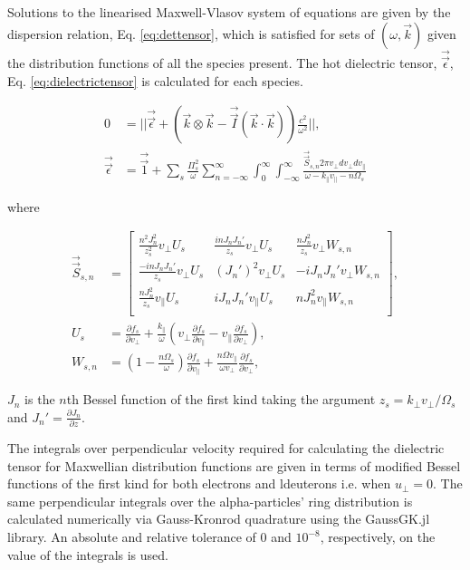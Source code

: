 \documentclass[12pt]{iopart}
\begin{document}
Solutions to the linearised Maxwell-Vlasov system of equations are given by the
dispersion relation, Eq. \ref{eq:dettensor}, which is satisfied for sets of
$(\omega,\vec{k})$ given the distribution functions of all the species present.
The hot dielectric tensor\cite{Stix}, $\vec{\vec{\epsilon}}$, Eq. \ref{eq:dielectrictensor} is calculated for each species.

\begin{align}
    0 &= ||\vec{\vec{\epsilon}} + \left(\vec{k} \otimes \vec{k} - \vec{\vec{I}}(\vec{k}\cdot\vec{k})\right) \frac{c^2}{\omega^2}||,\label{eq:dettensor}\\
    \vec{\vec{\epsilon}} &= \vec{\vec{1}} + \sum_s \frac{\Pi_s^2}{\omega}\sum_{n=-\infty}^{\infty}
    \int_0^{\infty}
    \int_{-\infty}^{\infty}\frac{\vec{\vec{S}}_{s,n} 2\pi v_\perp dv_\perp dv_\parallel}{\omega - k_\parallel v_\parallel - n \Omega_s}
    \label{eq:dielectrictensor}
\end{align}

\noindent where

\begin{align}
\vec{\vec{S}}_{s,n} &=
\begin{bmatrix}
\frac{n^2J_n^2}{z_s^2}v_\perp U_s & \frac{inJ_nJ_n'}{z_s}v_\perp U_s & \frac{n
  J_n^2}{z_s} v_\perp W_{s,n} \\
\frac{-inJ_nJ_n'}{z_s}v_\perp U_s & (J_n')^2 v_\perp U_s & -iJ_n J_n' v_\perp
  W_{s,n} \\
\frac{nJ_n^2}{z_s}v_\parallel U_s & iJ_nJ_n'v_\parallel U_s & n J_n^2
  v_\parallel W_{s,n} \\
\end{bmatrix}\label{eq:stenor},\\
U_s &= \frac{\partial f_s}{\partial v_\perp} + \frac{k_\parallel}{\omega}  \left(v_\perp \frac{\partial f_s}{\partial v_\parallel} - v_\parallel \frac{\partial f_s}{\partial v_\perp}\right)\label{eq:uterm},\\
  W_{s,n} &=\left(1- \frac{n\Omega_s}{\omega}\right)\frac{\partial f_s}{\partial v_\parallel} + \frac{n\Omega v_\parallel}{\omega v_\perp}\frac{\partial f_s}{\partial v_\perp}\label{eq:wterm},
\end{align}

\noindent $J_n$ is the $n$th Bessel function of the first kind taking the
argument $z_s=k_\perp v_\perp / \Omega_s$ and $J_n'=\frac{\partial J_n}{\partial z}$.

The integrals over perpendicular velocity required for calculating the
dielectric tensor for Maxwellian distribution functions are given in terms of
modified Bessel functions of the first kind\cite{Stix} for both electrons and
ldeuterons i.e. when $u_\perp =0$. The same perpendicular integrals over the
alpha-particles' ring distribution is calculated numerically via
Gauss-Kronrod\cite{Kronrod1965} quadrature using the GaussGK.jl\cite{QuadGK}
library. An absolute and relative tolerance of $0$ and $10^{-8}$, respectively,
on the value of the integrals is used.
\end{document}
